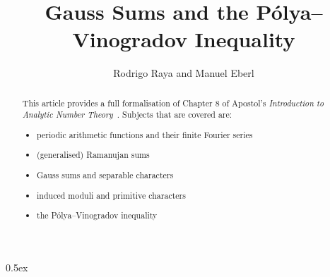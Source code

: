 \documentclass[11pt,a4paper]{article}
\begin{document}
\title{Gauss Sums and the P\'olya--Vinogradov Inequality}
\author{Rodrigo Raya and Manuel Eberl}
\maketitle

\begin{abstract}
This article provides a full formalisation of Chapter 8 of Apostol's \emph{Introduction to Analytic Number Theory}~\cite{apostol1976analytic}.
Subjects that are covered are:
\begin{itemize}
\item periodic arithmetic functions and their finite Fourier series
\item (generalised) Ramanujan sums
\item Gauss sums and separable characters
\item induced moduli and primitive characters
\item the P\'olya--Vinogradov inequality
\end{itemize}
\end{abstract}

\tableofcontents
\newpage
\parindent 0pt\parskip 0.5ex





\end{document}
